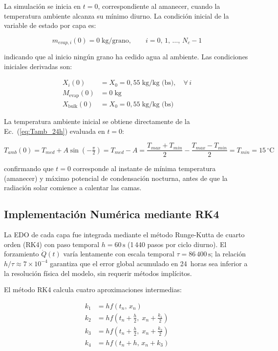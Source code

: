 \documentclass[conference]{IEEEtran}
\begin{document}
La simulación se inicia en $t = 0$, correspondiente al amanecer, cuando la temperatura ambiente alcanza su mínimo diurno. La condición inicial de la variable de estado por capa es:

\begin{equation}
m_{evap,i}(0) = 0\;\text{kg/grano}, \qquad i = 0,\,1,\,\ldots,\,N_c-1
\label{eq:ci_mevap}
\end{equation}

indicando que al inicio ningún grano ha cedido agua al ambiente. Las condiciones iniciales derivadas son:

\begin{align}
X_i(0) &= X_0 = 0{,}55\;\text{kg/kg (bs)},\quad \forall\,i
\label{eq:ci_Xi}\\[3pt]
M_{\text{evap}}(0) &= 0\;\text{kg}
\label{eq:ci_Mevap}\\[3pt]
X_{\text{bulk}}(0) &= X_0 = 0{,}55\;\text{kg/kg (bs)}
\label{eq:ci_Xbulk}
\end{align}

La temperatura ambiente inicial se obtiene directamente de la Ec.~(\ref{eq:Tamb_24h}) evaluada en $t = 0$:

\begin{equation}
T_{amb}(0)
= T_{med} + A\sin\!\left(-\tfrac{\pi}{2}\right)
= T_{med} - A
= \frac{T_{max}+T_{min}}{2} - \frac{T_{max}-T_{min}}{2}
= T_{min} = 15\,^{\circ}\text{C}
\label{eq:ci_Tamb}
\end{equation}

confirmando que $t = 0$ corresponde al instante de mínima temperatura (amanecer) y máximo potencial de condensación nocturna, antes de que la radiación solar comience a calentar las camas.

\subsection{Implementación Numérica mediante RK4}

La EDO de cada capa fue integrada mediante el método Runge-Kutta de cuarto orden (RK4) con paso temporal $h = 60\,\text{s}$ (1\,440 pasos por ciclo diurno). El forzamiento $\dot{Q}(t)$ varía lentamente con escala temporal $\tau = 86\,400\,\text{s}$; la relación $h/\tau \approx 7\times10^{-4}$ garantiza que el error global acumulado en 24~horas sea inferior a la resolución física del modelo, sin requerir métodos implícitos.

El método RK4 calcula cuatro aproximaciones intermedias:

\begin{align}
k_1 &= hf(t_n,\,x_n) \\
k_2 &= hf\!\left(t_n+\tfrac{h}{2},\; x_n+\tfrac{k_1}{2}\right) \\
k_3 &= hf\!\left(t_n+\tfrac{h}{2},\; x_n+\tfrac{k_2}{2}\right) \\
k_4 &= hf(t_n+h,\,x_n+k_3)
\end{align}
\end{document}
